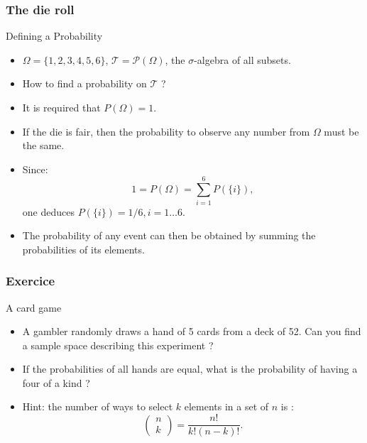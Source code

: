 \begin{frame}
    \frametitle{The die roll}
\begin{block}{Defining a Probability}
    \begin{itemize}
        \item<+-> $\Omega = \{1,2,3,4,5,6\}$, $\mathcal{T} = \mathcal{P}\left( \Omega \right)$, 
        the $\sigma$-algebra of all subsets. 
        \item<+-> How to find a probability on $\mathcal{T}$ ?
        \item<+-> It is required that $P\left( \Omega \right) = 1.$
        \item<+-> If the die is fair, then the probability to observe any number
        from $\Omega$ must be the same.
        \item<+-> Since:
        \begin{equation}
            1 = P\left( \Omega \right) = \sum_{i=1}^6 P\left( \{i\} \right),
        \end{equation}
        one deduces $P\left( \{i\} \right) = 1/6, i=1 \dots 6.$
        \item<+-> The probability of any event can then be obtained by summing the probabilities
        of its elements. 
    \end{itemize}
\end{block}
\end{frame}
\begin{frame}
    \frametitle{Exercice}
\begin{block}{A card game}
   \begin{itemize}
    \item<+-> A gambler randomly draws a hand of 5 cards from a deck of 52. Can you find 
    a sample space describing this experiment ?
    \item<+-> If the probabilities of all hands are equal, what is the probability of having a four of a kind ?
    \item<+-> Hint: the number of ways to select $k$ elements in a set of $n$
    is :
    \begin{equation}
        \begin{pmatrix}
            n \\ k
        \end{pmatrix} = \frac{n!}{k!\left( n-k \right)!}.
    \end{equation}
   \end{itemize} 
\end{block}
\end{frame}
